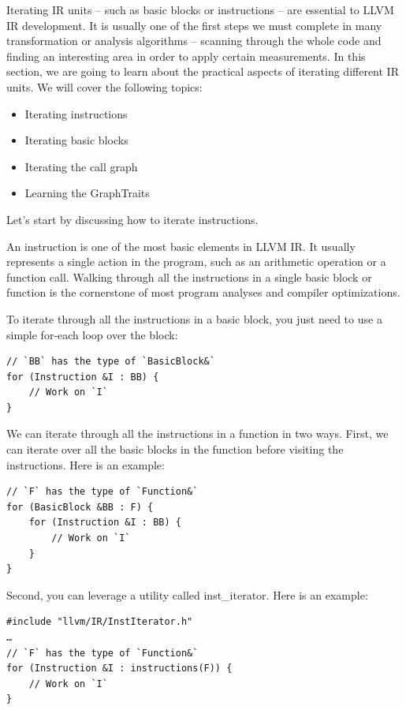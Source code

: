Iterating IR units – such as basic blocks or instructions – are essential to LLVM IR development. It is usually one of the first steps we must complete in many transformation or analysis algorithms – scanning through the whole code and finding an interesting area in order to apply certain measurements. In this section, we are going to learn about the practical aspects of iterating different IR units. We will cover the following topics:

\begin{itemize}
\item Iterating instructions
\item Iterating basic blocks
\item Iterating the call graph
\item Learning the GraphTraits
\end{itemize}

Let's start by discussing how to iterate instructions.


An instruction is one of the most basic elements in LLVM IR. It usually represents a single action in the program, such as an arithmetic operation or a function call. Walking through all the instructions in a single basic block or function is the cornerstone of most program analyses and compiler optimizations.

To iterate through all the instructions in a basic block, you just need to use a simple for-each loop over the block:

\begin{lstlisting}[style=styleCXX]
// `BB` has the type of `BasicBlock&`
for (Instruction &I : BB) {
	// Work on `I`
}
\end{lstlisting}

We can iterate through all the instructions in a function in two ways. First, we can iterate over all the basic blocks in the function before visiting the instructions. Here is an example:

\begin{lstlisting}[style=styleCXX]
// `F` has the type of `Function&`
for (BasicBlock &BB : F) {
	for (Instruction &I : BB) {
		// Work on `I`
	}
}
\end{lstlisting}

Second, you can leverage a utility called inst\_iterator. Here is an example:

\begin{lstlisting}[style=styleCXX]
#include "llvm/IR/InstIterator.h"
…
// `F` has the type of `Function&`
for (Instruction &I : instructions(F)) {
	// Work on `I`
}
\end{lstlisting}

